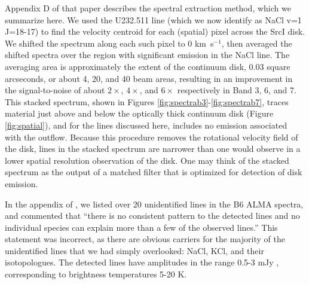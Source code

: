 \documentclass[12pt]{article}
\newcommand{\sourcei}{SrcI\xspace}
\newcommand{\kms}{\textrm{km~s}\ensuremath{^{-1}}\xspace}	%
\begin{document}
Appendix D of that paper describes the spectral extraction method,
which we summarize here.  We used the U232.511 line (which we now identify as
NaCl v=1 J=18-17) to find the velocity centroid for each (spatial) pixel
across the \sourcei disk.  We shifted the spectrum along
each such pixel to 0 \kms, then averaged the shifted spectra over the region with
significant emission in the NaCl line.  
The
averaging area is approximately the extent of the continuum disk, 0.03 square
arcseconds, or about 4, 20, and 40  beam areas, resulting
in an improvement in the signal-to-noise of about $2\times$, $4\times$, and $6\times$
respectively in Band 3, 6, and 7.
This stacked spectrum, shown in Figures \ref{fig:spectrab3}-\ref{fig:spectrab7},
traces material just above and below the optically thick continuum disk
(Figure \ref{fig:spatial}), and for the lines discussed here, includes no
emission associated with the outflow.  
Because this procedure removes the rotational velocity field of the disk,
lines in the stacked spectrum are narrower than one would observe in
a lower spatial resolution observation of the disk.  One may think of the
stacked spectrum as the output of a matched filter that is optimized for
detection of disk emission.



In the appendix of \cite{Ginsburg2018b}, we listed over 20 unidentified 
lines in the B6 ALMA spectra, and commented that ``there is no
consistent pattern to the detected lines and no individual species can explain
more than a few of the observed lines.''  This statement was incorrect, as
there are obvious carriers for the majority of the unidentified lines that we
had simply overlooked: NaCl, KCl, and their isotopologues.  The
detected lines have amplitudes in the range 0.5-3 mJy \perbeam, corresponding
to brightness temperatures 5-20 K.  
\end{document}
